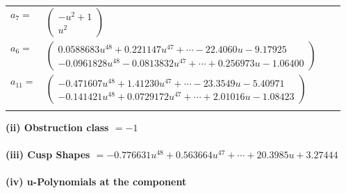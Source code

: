 \documentclass[1p]{elsarticle_modified}
\theoremstyle{definition}
\begin{document}
\begin{tabular}{m{7pt} m{180pt} m{7pt} m{180pt} }
\flushright $a_{7}=$&$\begin{pmatrix}- u^2+1\\u^2\end{pmatrix}$ \\
\flushright $a_{6}=$&$\begin{pmatrix}0.0588683 u^{48}+0.221147 u^{47}+\cdots-22.4060 u-9.17925\\-0.0961828 u^{48}-0.0813832 u^{47}+\cdots+0.256973 u-1.06400\end{pmatrix}$ \\
\flushright $a_{11}=$&$\begin{pmatrix}-0.471607 u^{48}+1.41230 u^{47}+\cdots-23.3549 u-5.40971\\-0.141421 u^{48}+0.0729172 u^{47}+\cdots+2.01016 u-1.08423\end{pmatrix}$\\&\end{tabular}
\flushleft \textbf{(ii) Obstruction class $= -1$}\\~\\
\flushleft \textbf{(iii) Cusp Shapes $= -0.776631 u^{48}+0.563664 u^{47}+\cdots+20.3985 u+3.27444$}\\~\\
\newpage\renewcommand{\arraystretch}{1}
\flushleft \textbf{(iv) u-Polynomials at the component}\newline \\
\end{document}

